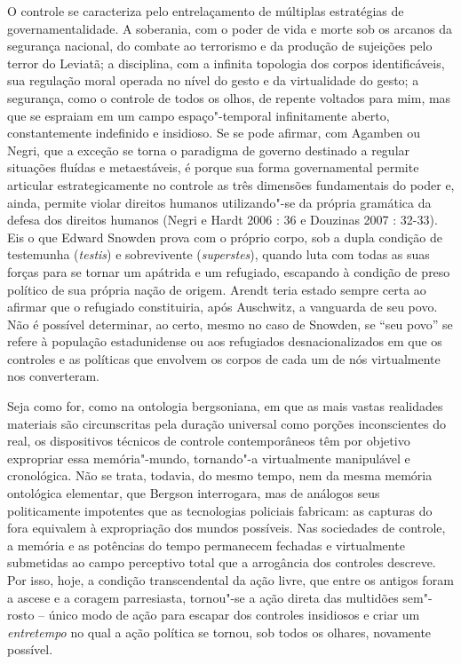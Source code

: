 O controle se caracteriza pelo entrelaçamento de múltiplas estratégias
de governamentalidade. A soberania, com o poder de vida e morte sob os
arcanos da segurança nacional, do combate ao terrorismo e da produção de
sujeições pelo terror do Leviatã; a disciplina, com a infinita topologia
dos corpos identificáveis, sua regulação moral operada no nível do gesto
e da virtualidade do gesto; a segurança, como o controle de todos os
olhos, de repente voltados para mim, mas que se espraiam em um campo
espaço"-temporal infinitamente aberto, constantemente indefinido e
insidioso. Se se pode afirmar, com Agamben ou Negri, que a exceção se
torna o paradigma de governo destinado a regular situações fluídas e
metaestáveis, é porque sua forma governamental permite articular
estrategicamente no controle as três dimensões fundamentais do poder e,
ainda, permite violar direitos humanos utilizando"-se da própria
gramática da defesa dos direitos humanos (Negri e Hardt 2006 : 36 e
Douzinas 2007 : 32-33). Eis o que Edward Snowden prova com o próprio
corpo, sob a dupla condição de testemunha (\emph{testis}) e sobrevivente
(\emph{superstes}), quando luta com todas as suas forças para se tornar
um apátrida e um refugiado, escapando à condição de preso político de
sua própria nação de origem. Arendt teria estado sempre certa ao afirmar
que o refugiado constituiria, após Auschwitz, a vanguarda de seu povo.
Não é possível determinar, ao certo, mesmo no caso de Snowden, se ``seu
povo'' se refere à população estadunidense ou aos refugiados
desnacionalizados em que os controles e as políticas que envolvem os
corpos de cada um de nós virtualmente nos converteram.

Seja como for, como na ontologia bergsoniana, em que as mais vastas
realidades materiais são circunscritas pela duração universal como
porções inconscientes do real, os dispositivos técnicos de controle
contemporâneos têm por objetivo expropriar essa memória"-mundo,
tornando"-a virtualmente manipulável e cronológica. Não se trata,
todavia, do mesmo tempo, nem da mesma memória ontológica elementar, que
Bergson interrogara, mas de análogos seus politicamente impotentes que
as tecnologias policiais fabricam: as capturas do fora equivalem à
expropriação dos mundos possíveis. Nas sociedades de controle, a memória
e as potências do tempo permanecem fechadas e virtualmente submetidas ao
campo perceptivo total que a arrogância dos controles descreve. Por
isso, hoje, a condição transcendental da ação livre, que entre os
antigos foram a ascese e a coragem parresiasta, tornou"-se a ação direta
das multidões sem"-rosto -- único modo de ação para escapar dos controles
insidiosos e criar um \emph{entretempo} no qual a ação política se
tornou, sob todos os olhares, novamente possível.

